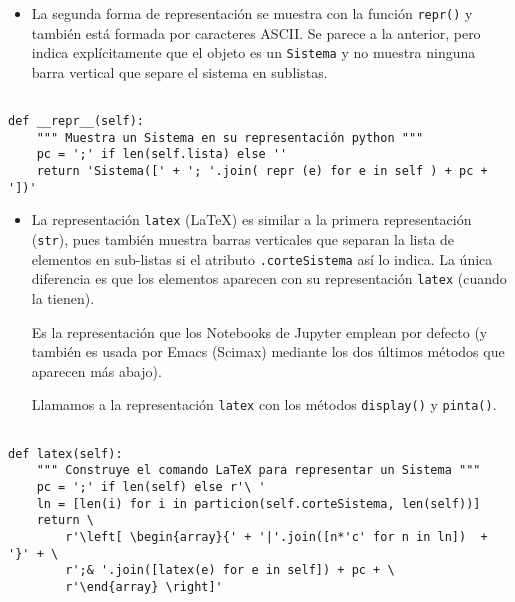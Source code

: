 \documentclass[11pt]{report}
\begin{document}
\begin{itemize}
\item La segunda forma de representación se muestra con la función
\texttt{repr()} y también está formada por caracteres ASCII. Se parece a la
anterior, pero indica explícitamente que el objeto es un \texttt{Sistema} y
no muestra ninguna barra vertical que separe el sistema en
sublistas.
\end{itemize}


\begin{verbatim}

def __repr__(self):
    """ Muestra un Sistema en su representación python """
    pc = ';' if len(self.lista) else ''
    return 'Sistema([' + '; '.join( repr (e) for e in self ) + pc + '])'

\end{verbatim}


\begin{itemize}
\item La representación \texttt{latex} (\LaTeX{}) es similar a la primera
representación (\texttt{str}), pues también muestra barras
verticales que separan la lista de elementos en sub-listas si el
atributo \texttt{.corteSistema} así lo indica. La única diferencia es que los
elementos aparecen con su representación \texttt{latex} (cuando la
tienen).

Es la representación que los Notebooks de Jupyter emplean por
defecto (y también es usada por Emacs (Scimax) mediante los dos
últimos métodos que aparecen más abajo).

Llamamos a la representación \texttt{latex} con los métodos \texttt{display()} y
\texttt{pinta()}.
\end{itemize}

\begin{verbatim}

def latex(self):
    """ Construye el comando LaTeX para representar un Sistema """
    pc = ';' if len(self) else r'\ '
    ln = [len(i) for i in particion(self.corteSistema, len(self))]                                                           
    return \
        r'\left[ \begin{array}{' + '|'.join([n*'c' for n in ln])  + '}' + \
        r';& '.join([latex(e) for e in self]) + pc + \
        r'\end{array} \right]'

\end{verbatim}
\end{document}
